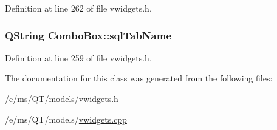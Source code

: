 Definition at line 262 of file vwidgets.h.

\hypertarget{classComboBox_a9c2352629cde1787cc7a10ea998168d1}{
\subsubsection[{sqlTabName}]{\setlength{\rightskip}{0pt plus 5cm}QString {\bf ComboBox::sqlTabName}}}
\label{classComboBox_a9c2352629cde1787cc7a10ea998168d1}


Definition at line 259 of file vwidgets.h.



The documentation for this class was generated from the following files:\begin{DoxyCompactItemize}
\item 
/e/ms/QT/models/\hyperlink{vwidgets_8h}{vwidgets.h}\item 
/e/ms/QT/models/\hyperlink{vwidgets_8cpp}{vwidgets.cpp}\end{DoxyCompactItemize}
